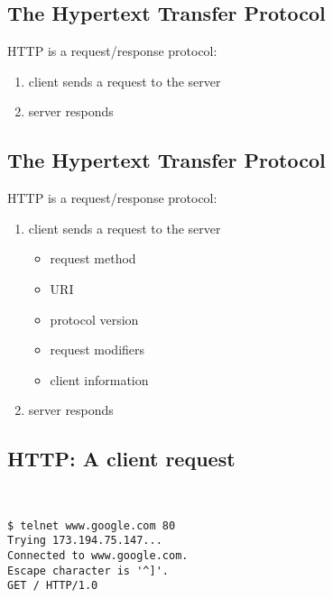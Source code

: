 \documentclass[xga]{xdvislides}
\begin{document}
\subsection{The Hypertext Transfer Protocol}
HTTP is a request/response protocol:
\begin{enumerate}
	\item client sends a request to the server
	\item server responds
\end{enumerate}

\subsection{The Hypertext Transfer Protocol}
HTTP is a request/response protocol:
\begin{enumerate}
	\item client sends a request to the server
		\begin{itemize}
			\item request method
			\item URI
			\item protocol version
			\item request modifiers
			\item client information
		\end{itemize}
	\item server responds
\end{enumerate}

\subsection{HTTP: A client request}
\vspace*{.5in}
\\
\Hugesize
\begin{center}
\begin{verbatim}
$ telnet www.google.com 80
Trying 173.194.75.147...
Connected to www.google.com.
Escape character is '^]'.
GET / HTTP/1.0
\end{verbatim}
\end{center}
\Normalsize
\vspace*{\fill}
\end{document}
